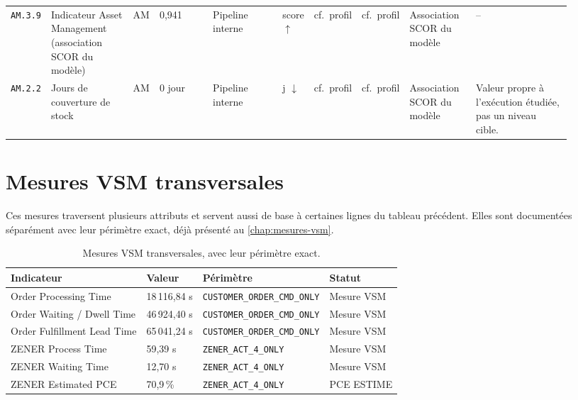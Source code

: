 \begin{landscape}
{\begin{longtable}{L{0.07\linewidth} L{0.15\linewidth} L{0.035\linewidth} L{0.10\linewidth} L{0.13\linewidth} L{0.035\linewidth} L{0.05\linewidth} L{0.05\linewidth} L{0.12\linewidth} L{0.18\linewidth}}
\texttt{AM.3.9} & Indicateur Asset Management (association SCOR du modèle) & AM & 0,941 & Pipeline interne & score $\uparrow$ & cf.~profil & cf.~profil & Association SCOR du modèle & -- \\
\texttt{AM.2.2} & Jours de couverture de stock & AM & 0 jour & Pipeline interne & j $\downarrow$ & cf.~profil & cf.~profil & Association SCOR du modèle & Valeur propre à l'exécution étudiée, pas un niveau cible. \\

\end{longtable}
}
\end{landscape}


\section{Mesures VSM transversales}

Ces mesures traversent plusieurs attributs et servent aussi de base à certaines lignes du tableau précédent. Elles sont documentées séparément avec leur périmètre exact, déjà présenté au \cref{chap:mesures-vsm}.

\begin{table}[H]
  \centering
  \small
  \begin{tabularx}{\textwidth}{L{0.28\textwidth} L{0.16\textwidth} L{0.14\textwidth} Y}
    \toprule
    Indicateur & Valeur & Périmètre & Statut \\
    \midrule
    Order Processing Time & 18\,116,84 s & \texttt{CUSTOMER\_\allowbreak ORDER\_\allowbreak CMD\_\allowbreak ONLY} & Mesure VSM \\
    Order Waiting / Dwell Time & 46\,924,40 s & \texttt{CUSTOMER\_\allowbreak ORDER\_\allowbreak CMD\_\allowbreak ONLY} & Mesure VSM \\
    Order Fulfillment Lead Time & 65\,041,24 s & \texttt{CUSTOMER\_\allowbreak ORDER\_\allowbreak CMD\_\allowbreak ONLY} & Mesure VSM \\
    ZENER Process Time & 59,39 s & \texttt{ZENER\_\allowbreak ACT\_4\_\allowbreak ONLY} & Mesure VSM \\
    ZENER Waiting Time & 12,70 s & \texttt{ZENER\_\allowbreak ACT\_4\_\allowbreak ONLY} & Mesure VSM \\
    ZENER Estimated PCE & 70,9\,\% & \texttt{ZENER\_\allowbreak ACT\_4\_\allowbreak ONLY} & PCE ESTIME \\
    \bottomrule
  \end{tabularx}
  \caption{Mesures VSM transversales, avec leur périmètre exact.}
  \label{tab:vsm-transverses-annexe}
\end{table}

